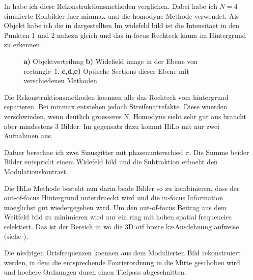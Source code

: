 In  habe ich diese
Rekonstruktionsmethoden verglichen. Dabei habe ich $N=4$ simulierte
Rohbilder fuer minmax und die homodyne Methode verwendet. Als Objekt
habe ich die in  dargestellten Im
widefeld bild ist die Intensitaet in den Punkten 1 und 2 nahezu gleich
und das in-focus Rechteck kaum im Hintergrund zu erkennen.

\begin{figure}[htbp]
  \centering
  \caption{{\bf a)} Objektverteilung {\bf b)} Widefield image in der
    Ebene von rectangle~1. {\bf c,d,e)} Optische Sections dieser Ebene
    mit verschiedenen Methoden}
  \label{fig:hilo-sec-comparison}
\end{figure}

Die Rekonstruktionsmethoden koennen alle das Rechteck vom hintergrund
separieren. Bei minmax entstehen jedoch Streifenartefakte. Diese
wuerden verschwinden, wenn deutlich groesseres N. Homodyne sieht sehr
gut aus braucht aber mindestens 3 Bilder. Im gegensatz dazu kommt HiLo
mit nur zwei Aufnahmen aus.

Dafuer berechne ich zwei Sinusgitter mit phasenunterschied $\pi$. Die
Summe beider Bilder entspricht einem Widefeld bild und die Subtraktion
erhoeht den Modulationskontrast. 

Die HiLo Methode besteht nun darin beide Bilder so zu kombinieren,
dass der out-of-focus Hintergrund unterdrueckt wird und die in-focus
Information moeglichst gut wiedergegeben wird.  Um den out-of-focus
Beitrag aus dem Weitfeld bild zu minimieren wird nur ein ring mit
hohen spatial frequencies selektiert. Das ist der Bereich in wo die 3D
otf breite kz-Ausdehnung aufweise (siehe ).

Die niedrigen Ortsfrequenzen koennen aus dem Modulierten Bild
rekonstruiert werden, in dem die entsprechende Fourierordnung in die
Mitte geschoben wird und hoehere Ordnungen durch einen Tiefpass
abgeschnitten.
\begin{figure}[htbp]
  \centering
  \caption{}
  \label{fig:hilo-method-description}
\end{figure}






